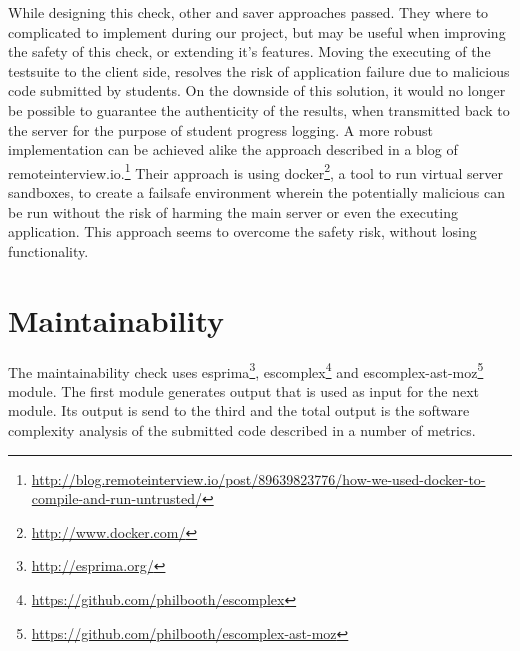 While designing this \gls{check}, other and saver approaches passed. They where
to complicated to implement during our project, but may be useful when improving
the safety of this check, or extending it's features. Moving the executing of the
testsuite to the client side, resolves the risk of application failure due to
malicious code submitted by \glspl{student}. On the downside of this solution, it would
no longer be possible to guarantee the authenticity of the results, when
transmitted back to the server for the purpose of student progress logging. 
A more robust implementation can be achieved alike the approach described in a
blog of remoteinterview.io.\footnote{\url{http://blog.remoteinterview.io/post/89639823776/how-we-used-docker-to-compile-and-run-untrusted/}}
Their approach is using docker\footnote{\url{http://www.docker.com/}}, a tool to
run virtual server sandboxes, to create a failsafe environment wherein the 
potentially malicious can be run without the risk of harming the main server or
even the executing application. This approach seems to overcome the safety risk,
without losing functionality. 

\section{Maintainability}

The maintainability \gls{check} uses esprima\footnote{\url{http://esprima.org/}},
escomplex\footnote{\url{https://github.com/philbooth/escomplex}} and
escomplex-ast-moz\footnote{\url{https://github.com/philbooth/escomplex-ast-moz}} module.
The first module generates output that is used as input for the next module.
Its output is send to the third and the total output is the software
complexity analysis of the submitted code described in a number of metrics.

